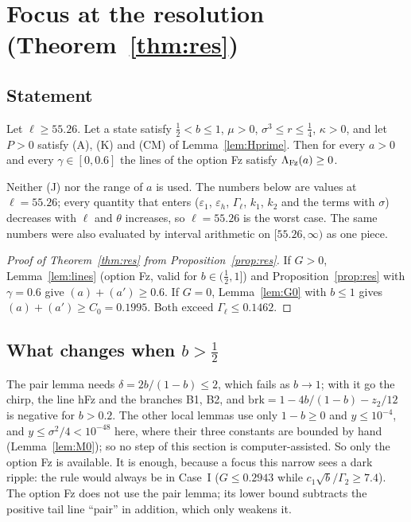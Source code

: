 \section{Focus at the resolution (Theorem~\ref{thm:res})}
\label{sec:res}

\subsection{Statement}

\begin{proposition} \proofst
\label{prop:res}
Let $\ell\ge55.26$.
Let a state satisfy $\tfrac12<b\le1$, $\mu>0$, $\sigma^3\le r\le\tfrac14$, $\kappa>0$, and let $P>0$ satisfy (A), (K) and (CM) of Lemma~\ref{lem:Hprime}.
Then for every $a>0$ and every $\gamma\in[0,0.6]$ the lines of the option Fz satisfy $\Lambda_{\rm Fz}(a)\ge0$.
\end{proposition}

Neither (J) nor the range of $a$ is used.
The numbers below are values at $\ell=55.26$; every quantity that enters ($\varepsilon_1$, $\varepsilon_h$, $\Gamma_\ell$, $k_1$, $k_2$ and the terms with $\sigma$) decreases with $\ell$ and $\theta$ increases, so $\ell=55.26$ is the worst case.
The same numbers were also evaluated by interval arithmetic on $[55.26,\infty)$ as one piece.

\begin{proof}[Proof of Theorem~\ref{thm:res} from Proposition~\ref{prop:res}]
If $G>0$, Lemma~\ref{lem:lines} (option Fz, valid for $b\in(\tfrac12,1]$) and Proposition~\ref{prop:res} with $\gamma=0.6$ give $(a)+(a')\ge0.6$.
If $G=0$, Lemma~\ref{lem:G0} with $b\le1$ gives $(a)+(a')\ge C_0=0.1995$.
Both exceed $\Gamma_\ell\le0.1462$.
\end{proof}

\subsection{What changes when $b>\tfrac12$}

The pair lemma needs $\delta=2b/(1-b)\le2$, which fails as $b\to1$; with it go the chirp, the line hFz and the branches B1, B2, and $\mathrm{brk}=1-4b/(1-b)-z_2/12$ is negative for $b>0.2$.
The other local lemmas use only $1-b\ge0$ and $y\le10^{-4}$, and $y\le\sigma^2/4<10^{-48}$ here, where their three constants are bounded by hand (Lemma~\ref{lem:M0}); so no step of this section is computer-assisted.
So only the option Fz is available.
It is enough, because a focus this narrow sees a dark ripple: the rule would always be in Case~I ($G\le0.2943$ while $c_1\sqrt b/\Gamma_2\ge7.4$).
The option Fz does not use the pair lemma; its lower bound subtracts the positive tail line ``pair'' in addition, which only weakens it.


